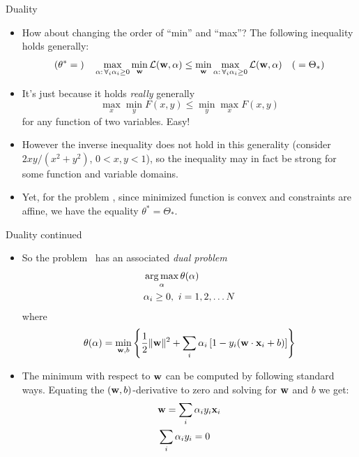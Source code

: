 \documentclass[handout]{beamer}   %
\def\L{\mathcal{L}}
\def\argmax{\mathop{\rm arg\,max}\limits}
\def\b#1{{\bf #1}}
\begin{document}
\begin{frame}{Duality}
  \begin{itemize}
  \item How about changing the order of ``min'' and ``max''? The following inequality holds
    generally:
    \begin{equation*}
      (\theta^* = {})\quad
      \max_{\alpha:\,\forall_i\alpha_i\ge 0} \min_{\b w} \L(\b w, \alpha) \le
      \min_{\b w} \max_{\alpha:\,\forall_i\alpha_i\ge 0} \L(\b w, \alpha)
      \quad({}=\Theta_*)
    \end{equation*}

    \pause
  \item It's just because it holds {\it really\/} generally
    \begin{equation*}
      \max_x \min_y F(x,y) \le \min_y \max_x F(x, y)
    \end{equation*}
    for any function of two variables. Easy!

    \pause
  \item However the inverse inequality does not hold in this generality
    (consider $2xy/(x^2+y^2)$, $0<x,y<1$),
    so the inequality may in fact be strong for some function and variable domains.

    \pause
  \item Yet, for the problem \svmprimary, since minimized function is convex
    and constraints are affine, we have the equality $\theta^*=\Theta_*$.
  \end{itemize}
\end{frame}


\begin{frame}{Duality continued}
  \begin{itemize}
  \item So the problem \svmprimary\ has an associated {\it dual problem}
    \begin{align}
      \label{eq:svm:dual:opt}
      {}& \argmax_\alpha \theta(\alpha) \\
      \label{eq:svm:dual:constr}
      {}& \alpha_i \ge 0, \ i=1,2,\ldots N
    \end{align}
    where
    \begin{equation*}
      \theta(\alpha) %
            = \min_{\b w, b} \left\{ {1\over 2} \|\b w\|^2
            + \sum_i \alpha_i\left[1 - y_i(\b w \cdot \b x_i + b) \right]
            \right\}
    \end{equation*}

    \pause
  \item The minimum with respect to $\b w$ can be computed by following standard
    ways. Equating the $(\b w,b)$-derivative to zero and solving for $\b w$ and $b$
    we get:
    \begin{align}
      \label{eq:svm:dual:w}
      {}& \b w = \sum_i\alpha_iy_i\b x_i \\
      \label{eq:svm:dual:b}
      {}& \sum_i\alpha_iy_i=0
    \end{align}
  \end{itemize}
\end{frame}
\end{document}
